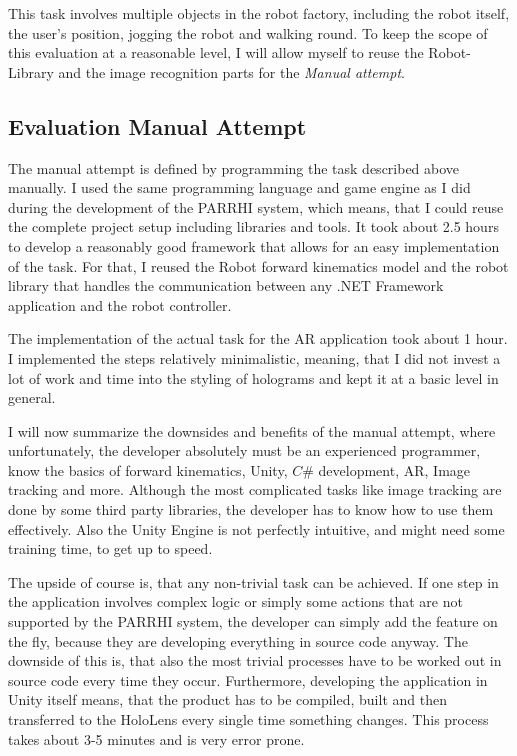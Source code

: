 This task involves multiple objects in the robot factory, including the robot itself, the user's position, jogging the robot and walking round. To keep the scope of this evaluation at a reasonable level, I will allow myself to reuse the Robot-Library and the image recognition parts for the \textit{Manual attempt}. 

\subsection{Evaluation Manual Attempt}

The manual attempt is defined by programming the task described above manually. I used the same programming language and game engine as I did during the development of the PARRHI system, which means, that I could reuse the complete project setup including libraries and tools. It took about 2.5 hours to develop a reasonably good framework that allows for an easy implementation of the task. For that, I reused the Robot forward kinematics model and the robot library that handles the communication between any .NET Framework application and the robot controller. 

The implementation of the actual task for the AR application took about 1 hour. I implemented the steps relatively minimalistic, meaning, that I did not invest a lot of work and time into the styling of holograms and kept it at a basic level in general.

I will now summarize the downsides and benefits of the manual attempt, where unfortunately, the developer absolutely must be an experienced programmer, know the basics of forward kinematics, Unity, $C\#$ development, AR, Image tracking and more. Although the most complicated tasks like image tracking are done by some third party libraries, the developer has to know how to use them effectively. Also the Unity Engine is not perfectly intuitive, and might need some training time, to get up to speed.

The upside of course is, that any non-trivial task can be achieved. If one step in the application involves complex logic or simply some actions that are not supported by the PARRHI system, the developer can simply add the feature on the fly, because they are developing everything in source code anyway. The downside of this is, that also the most trivial processes have to be worked out in source code every time they occur. Furthermore, developing the application in Unity itself means, that the product has to be compiled, built and then transferred to the HoloLens every single time something changes. This process takes about 3-5 minutes and is very error prone.

